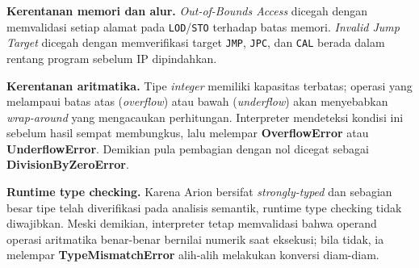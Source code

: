 \textbf{Kerentanan memori dan alur.} \emph{Out-of-Bounds Access} dicegah dengan
memvalidasi setiap alamat pada \texttt{LOD}/\texttt{STO} terhadap batas memori.
\emph{Invalid Jump Target} dicegah dengan memverifikasi target \texttt{JMP},
\texttt{JPC}, dan \texttt{CAL} berada dalam rentang program sebelum IP dipindahkan.

\textbf{Kerentanan aritmatika.} Tipe \emph{integer} memiliki kapasitas terbatas;
operasi yang melampaui batas atas (\emph{overflow}) atau bawah (\emph{underflow})
akan menyebabkan \emph{wrap-around} yang mengacaukan perhitungan. Interpreter
mendeteksi kondisi ini sebelum hasil sempat membungkus, lalu melempar
\textbf{OverflowError} atau \textbf{UnderflowError}. Demikian pula pembagian dengan
nol dicegat sebagai \textbf{DivisionByZeroError}.

\textbf{Runtime type checking.} Karena Arion bersifat \emph{strongly-typed} dan
sebagian besar tipe telah diverifikasi pada analisis semantik, runtime type
checking tidak diwajibkan. Meski demikian, interpreter tetap memvalidasi bahwa
operand operasi aritmatika benar-benar bernilai numerik saat eksekusi; bila tidak,
ia melempar \textbf{TypeMismatchError} alih-alih melakukan konversi diam-diam.
